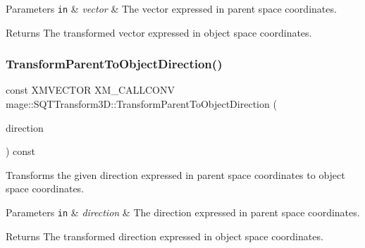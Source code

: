 \begin{DoxyParams}[1]{Parameters}
\mbox{\tt in}  & {\em vector} & The vector expressed in parent space coordinates. \\
\hline
\end{DoxyParams}
\begin{DoxyReturn}{Returns}
The transformed vector expressed in object space coordinates. 
\end{DoxyReturn}
\mbox{\label{classmage_1_1_s_q_t_transform3_d_a55ca93f4e7d3e038985fdaa221f091f3}} 
\subsubsection{\texorpdfstring{Transform\+Parent\+To\+Object\+Direction()}{TransformParentToObjectDirection()}}
{\footnotesize\ttfamily const X\+M\+V\+E\+C\+T\+OR X\+M\+\_\+\+C\+A\+L\+L\+C\+O\+NV mage\+::\+S\+Q\+T\+Transform3\+D\+::\+Transform\+Parent\+To\+Object\+Direction (\begin{DoxyParamCaption}\item[{F\+X\+M\+V\+E\+C\+T\+OR}]{direction }\end{DoxyParamCaption}) const\hspace{0.3cm}{\ttfamily [noexcept]}}

Transforms the given direction expressed in parent space coordinates to object space coordinates.


\begin{DoxyParams}[1]{Parameters}
\mbox{\tt in}  & {\em direction} & The direction expressed in parent space coordinates. \\
\hline
\end{DoxyParams}
\begin{DoxyReturn}{Returns}
The transformed direction expressed in object space coordinates. 
\end{DoxyReturn}
\mbox{\label{classmage_1_1_s_q_t_transform3_d_a243e62b2245f07f9b57a63cc462b0516}} 
